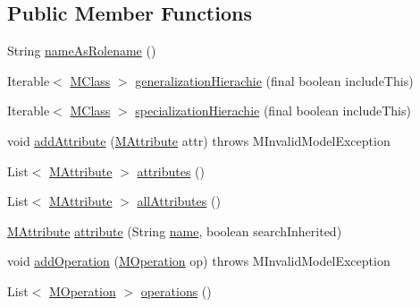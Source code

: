 \subsection*{Public Member Functions}
\begin{DoxyCompactItemize}
\item 
String \hyperlink{classorg_1_1tzi_1_1use_1_1uml_1_1mm_1_1_m_class_impl_a6215aefe5dde88e7c2177983a6d0babb}{name\-As\-Rolename} ()
\item 
Iterable$<$ \hyperlink{interfaceorg_1_1tzi_1_1use_1_1uml_1_1mm_1_1_m_class}{M\-Class} $>$ \hyperlink{classorg_1_1tzi_1_1use_1_1uml_1_1mm_1_1_m_class_impl_ab763cde974cc274823c8ba656475c601}{generalization\-Hierachie} (final boolean include\-This)
\item 
Iterable$<$ \hyperlink{interfaceorg_1_1tzi_1_1use_1_1uml_1_1mm_1_1_m_class}{M\-Class} $>$ \hyperlink{classorg_1_1tzi_1_1use_1_1uml_1_1mm_1_1_m_class_impl_a874941f393a295b2d3fe9d54c8820b41}{specialization\-Hierachie} (final boolean include\-This)
\item 
void \hyperlink{classorg_1_1tzi_1_1use_1_1uml_1_1mm_1_1_m_class_impl_a47d1002574d175e7458a97eddde2ffac}{add\-Attribute} (\hyperlink{classorg_1_1tzi_1_1use_1_1uml_1_1mm_1_1_m_attribute}{M\-Attribute} attr)  throws M\-Invalid\-Model\-Exception 
\item 
List$<$ \hyperlink{classorg_1_1tzi_1_1use_1_1uml_1_1mm_1_1_m_attribute}{M\-Attribute} $>$ \hyperlink{classorg_1_1tzi_1_1use_1_1uml_1_1mm_1_1_m_class_impl_a9d0fe27205e90f6eff163babb931bcf0}{attributes} ()
\item 
List$<$ \hyperlink{classorg_1_1tzi_1_1use_1_1uml_1_1mm_1_1_m_attribute}{M\-Attribute} $>$ \hyperlink{classorg_1_1tzi_1_1use_1_1uml_1_1mm_1_1_m_class_impl_aaf305d8eeafb8a59da6db817464a19a9}{all\-Attributes} ()
\item 
\hyperlink{classorg_1_1tzi_1_1use_1_1uml_1_1mm_1_1_m_attribute}{M\-Attribute} \hyperlink{classorg_1_1tzi_1_1use_1_1uml_1_1mm_1_1_m_class_impl_a4efc8b6282d21724cead82d5f64c1ec4}{attribute} (String \hyperlink{classorg_1_1tzi_1_1use_1_1uml_1_1mm_1_1_m_model_element_impl_ac9997b04c10d247c21c22d431d99400d}{name}, boolean search\-Inherited)
\item 
void \hyperlink{classorg_1_1tzi_1_1use_1_1uml_1_1mm_1_1_m_class_impl_ae1b8ba73d45987e872e5bc8a5bb78767}{add\-Operation} (\hyperlink{classorg_1_1tzi_1_1use_1_1uml_1_1mm_1_1_m_operation}{M\-Operation} op)  throws M\-Invalid\-Model\-Exception 
\item 
List$<$ \hyperlink{classorg_1_1tzi_1_1use_1_1uml_1_1mm_1_1_m_operation}{M\-Operation} $>$ \hyperlink{classorg_1_1tzi_1_1use_1_1uml_1_1mm_1_1_m_class_impl_a7b3a707cf44736e812b805424668265f}{operations} ()

\end{DoxyCompactItemize}
